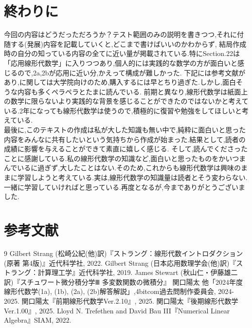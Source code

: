 \section{終わりに}
今回の内容はどうだっただろうか？テスト範囲のみの説明を書きつつ,それに付随する(発展)内容を記載していくと,どこまで書けばいいのかわからず,
結局作成時の自分の知っている内容の全てに近い量が掲載されている.特にSection.22は「応用線形代数学」に入りつつあり,個人的には実践的な数学の方が面白いと感じるので,2a,2bが応用に近い分,かえって構成が難しかった.
下記には参考文献があり,\cite{physics}に関しては大学院向けのため,購入するには早とちり過ぎた.しかし,面白そうな内容も多くペラペラとたまに読んでいる.
前期と異なり,線形代数学は紙面上の数学に限らないより実践的な背景を感じることができたのではないかと考えている.2年になっても線形代数学は使うので,積極的に復習や勉強をしてほしいと考えている.\\
\hspace{1em}
最後に,このテキストの作成は私が大した知識も無い中で,純粋に面白いと思った内容をみんなに共有したいという気持ちから作成が始まった.結果として,読者の成績に影響を与えることができて素直に嬉しく感じる.
そして,読んでくださったことに感謝している.私の線形代数学の知識など,面白いと思ったものをかいつまんでいるに過ぎず,大したことはない.そのため,これからも線形代数学は興味のままに学習しようと考えている.実は,線形代数学の知識量は読者とそう変わらない.
一緒に学習していければと思っている.再度となるが,今までありがとうございました.
\section{参考文献}
\begin{thebibliography}{9}
  Gilbert Strang (松崎公紀(他)訳)『ストラング：線形代数イントロダクション(原著 第4版)』近代科学社, 2022.
  Gilbert Strang (日本応用数理学会(他)訳)『ストラング：計算理工学』近代科学社, 2019.
  James Stewart (秋山仁・伊藤雄二 訳)『スチュワート微分積分学Ⅲ 多変数関数の微積分』
  関口陽太 他「2024年度線形代数学(1a), (1b), (2a), (2b)解答解説」,4bitcom過去問制作委員会, 2024-2025.
  関口陽太『前期線形代数学Ver.2.10』, 2025.
  関口陽太『後期線形代数学Ver.1.00』, 2025.
  Lloyd N. Trefethen and David Bau III『Numerical Linear Algebra』SIAM, 2022.
\end{thebibliography}
\newpage